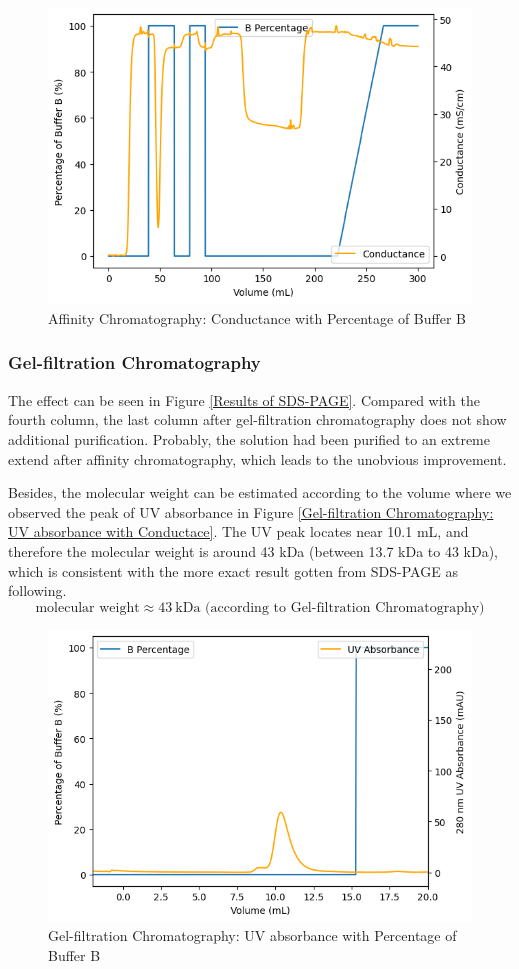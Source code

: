 \documentclass{report}
\begin{document}
\begin{figure}
    \centering
    \includegraphics[width=0.6\linewidth]{../Figures/Affinity Column Conductance.png}
    \caption{Affinity Chromatography: Conductance with Percentage of Buffer B}
    \label{Affinity Chromatography: Conductance}
\end{figure}
\subsubsection{Gel-filtration Chromatography}
The effect can be seen in Figure \ref{Results of SDS-PAGE}.
Compared with the fourth column, the last column after gel-filtration chromatography does not show additional purification.
Probably, the solution had been purified to an extreme extend after affinity chromatography, which leads to the unobvious improvement.

Besides, the molecular weight can be estimated according to the volume where we observed the peak of UV absorbance in Figure \ref{Gel-filtration Chromatography: UV absorbance with Conductace}.
The UV peak locates near 10.1 mL, and therefore the molecular weight is around 43 kDa (between 13.7 kDa to 43 kDa), which is consistent with the more exact result gotten from SDS-PAGE as following.
$$
\text{molecular weight}\approx 43 \ \text{kDa (according to Gel-filtration Chromatography)}
$$
\begin{figure}
    \centering
    \includegraphics[width=0.6\linewidth]{../Figures/Filtration Column UV.png}
    \caption{Gel-filtration Chromatography: UV absorbance with Percentage of Buffer B}
    \label{Gel-filtration Chromatography: UV absorbance with Percentage of Buffer B}
\end{figure}
\end{document}
